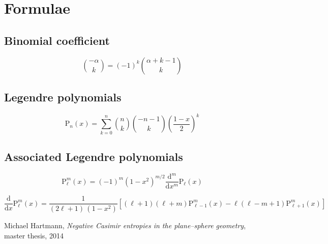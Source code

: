 \documentclass[10pt]{article}
\newcommand{\Plm}[2]{{\text{P}_{#1}^{#2}}}
\begin{document}
\appendix

\section{Formulae}

\subsection{Binomial coefficient}
\begin{equation}
\label{appendix:binom}
\binom{-\alpha}{k} = (-1)^k \binom{\alpha+k-1}{k}
\end{equation}


\subsection{Legendre polynomials}

\begin{equation}
\label{appendix:Pn}
\Plm{n}{}(x) = \sum_{k=0}^n \binom{n}{k} \binom{-n-1}{k} \left(\frac{1-x}{2}\right)^k
\end{equation}


\subsection{Associated Legendre polynomials}

\begin{equation}
\label{appendix:Plm}
\Plm{\ell}{m}(x) = (-1)^m (1-x^2)^{m/2} \frac{\mathrm{d}^m}{\mathrm{d}x^m} \Plm{\ell}{}(x)
\end{equation}

\begin{equation}
\label{appendix:dPlm}
\frac{\mathrm{d}}{\mathrm{d}x} \Plm{\ell}{m}(x) = \frac{1}{(2\ell+1) \, (1-x^2)} \left[ (\ell+1)(\ell+m)\Plm{\ell-1}{m}(x) - \ell(\ell-m+1)\Plm{\ell+1}{m}(x) \right]
\end{equation}



\begin{thebibliography}{9}

  Michael Hartmann,
  \emph{Negative Casimir entropies in the plane–sphere geometry}, master thesis, 2014

\end{thebibliography}
\end{document}
